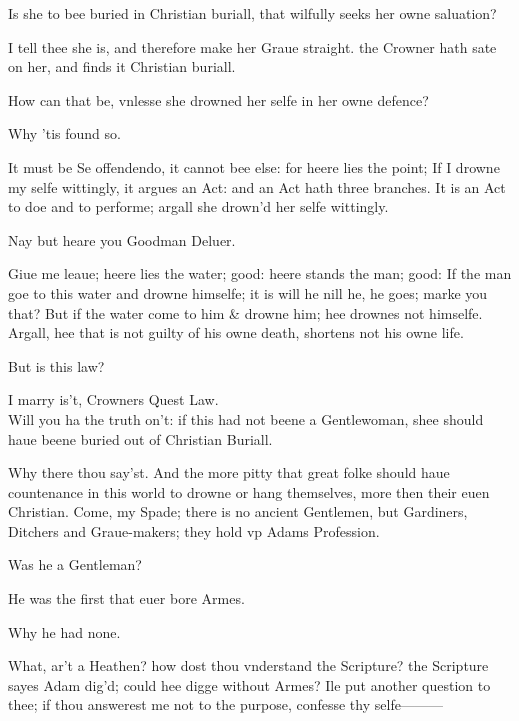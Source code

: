 \documentclass[a5paper,DIV=calc,11pt]{scrbook}
\begin{document}
\begin{drama*}
     Is she to bee buried in Christian buriall, that wilfully seeks her owne saluation?
    
     I tell thee she is, and therefore make her Graue straight. the Crowner hath sate on her, and finds it Christian buriall.
    
     How can that be, vnlesse she drowned her selfe in her owne defence?
    
     Why 'tis found so.
    
     It must be Se offendendo, it cannot bee else: for heere lies the point; If I drowne my selfe wittingly, it argues an Act: and an Act hath three branches. It is an Act to doe and to performe; argall she drown'd her selfe wittingly.
    
     Nay but heare you Goodman Deluer.
    
     Giue me leaue; heere lies the water; good: heere stands the man; good: If the man goe to this water and drowne himselfe; it is will he nill he, he goes; marke you that? But if the water come to him \& drowne him; hee drownes not himselfe. Argall, hee that is not guilty of his owne death, shortens not his owne life.
    
     But is this law?
    
     I marry is't, Crowners Quest Law.\\
    Will you ha the truth on't: if this had not beene a Gentlewoman, shee should haue beene buried out of Christian Buriall.
    
     Why there thou say'st. And the more pitty that great folke should haue countenance in this world to drowne or hang themselves, more then their euen Christian. Come, my Spade; there is no ancient Gentlemen, but Gardiners, Ditchers and Graue-makers; they hold vp Adams Profession.
    
     Was he a Gentleman?
    
     He was the first that euer bore Armes.
    
     Why he had none.
    
     What, ar't a Heathen? how dost thou vnderstand the Scripture? the Scripture sayes Adam dig'd; could hee digge without Armes? Ile put another question to thee; if thou answerest me not to the purpose, confesse thy selfe———
    

\end{drama*}
\end{document}
